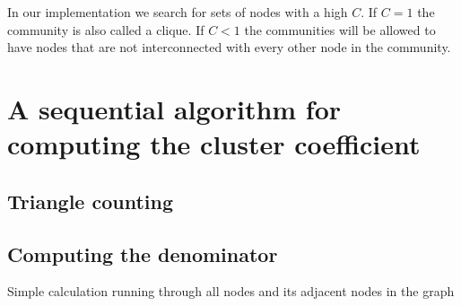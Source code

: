 \documentclass{article}
\begin{document}
In our implementation we search for sets of nodes with a high $C$. If $C=1$ the community is also called a clique. If $C < 1$ the communities will be allowed to have nodes that are not interconnected with every other node in the community.






\section{A sequential algorithm for computing the cluster coefficient}

\subsection{Triangle counting}

\subsection{Computing the denominator}
Simple calculation running through all nodes and its adjacent nodes in the graph
\end{document}
